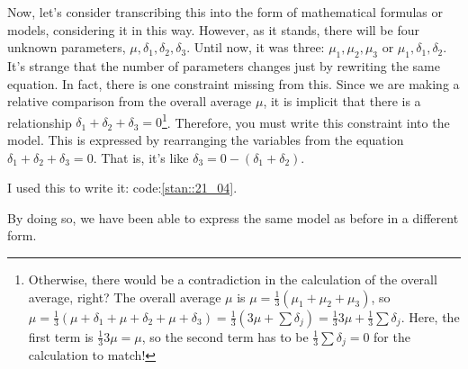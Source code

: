 \documentclass{ltjsbook}
\begin{document}
Now, let's consider transcribing this into the form of mathematical formulas or models, considering it in this way.
However, as it stands, there will be four unknown parameters, $\mu,\delta_1,\delta_2,\delta_3$. Until now, it was three: $\mu_1,\mu_2,\mu_3$ or $\mu_1,\delta_1,\delta_2$. It's strange that the number of parameters changes just by rewriting the same equation.
In fact, there is one constraint missing from this. Since we are making a relative comparison from the overall average $\mu$, it is implicit that there is a relationship $\delta_1+\delta_2+\delta_3=0$\footnote{Otherwise, there would be a contradiction in the calculation of the overall average, right? The overall average $\mu$ is $\mu = \frac{1}{3}(\mu_1+\mu_2+\mu_3)$, so $\mu = \frac{1}{3}(\mu+\delta_1+\mu+\delta_2+\mu+\delta_3) =\frac{1}{3}(3\mu + \sum \delta_j) = \frac{1}{3}3\mu + \frac{1}{3}\sum \delta_j$. Here, the first term is $\frac{1}{3}3\mu = \mu$, so the second term has to be $\frac{1}{3}\sum \delta_j = 0$ for the calculation to match!}.
Therefore, you must write this constraint into the model. This is expressed by rearranging the variables from the equation $\delta_1+\delta_2+\delta_3=0$. That is, it's like $\delta_3 = 0 - (\delta_1+\delta_2)$.

I used this to write it: code:\ref{stan::21_04}.


By doing so, we have been able to express the same model as before in a different form.
\end{document}
